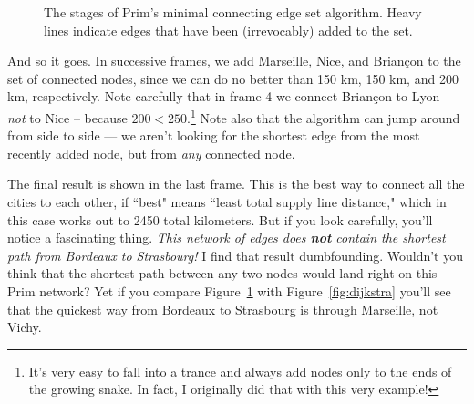 \begin{figure}[ht]
\begin{custommargins}{-2.4cm}{-2.8cm}

\caption{The stages of Prim's minimal connecting edge set algorithm. Heavy
lines indicate edges that have been (irrevocably) added to the set.}
\label{prim}
\end{custommargins}
\end{figure}

\afterpage{\clearpage}

And so it goes. In successive frames, we add Marseille, Nice, and Brian\c{c}on
to the set of connected nodes, since we can do no better than 150 km, 150 km,
and 200 km, respectively. Note carefully that in frame 4 we connect
Brian\c{c}on to Lyon -- \textit{not} to Nice -- because $200 <
250$.\footnote{It's very easy to fall into a trance and always add nodes only
to the ends of the growing snake. In fact, I originally did that with this very
example!} Note also that
the algorithm can jump around from side to side --- we aren't looking for the
shortest edge from the most recently added node, but from \textit{any}
connected node.

The final result is shown in the last frame. This is the best way to connect
all the cities to each other, if ``best" means ``least total supply line
distance," which in this case works out to 2450 total kilometers. But if you
look carefully, you'll notice a fascinating thing. \textit{This network of
edges does \textbf{not} contain the shortest path from Bordeaux to Strasbourg!}
I find that result dumbfounding. Wouldn't you think that the shortest path
between any two nodes would land right on this Prim network? Yet if you compare
Figure~\ref{prim} with Figure~\ref{fig:dijkstra} you'll see that the quickest
way from Bordeaux to Strasbourg is through Marseille, not Vichy.

